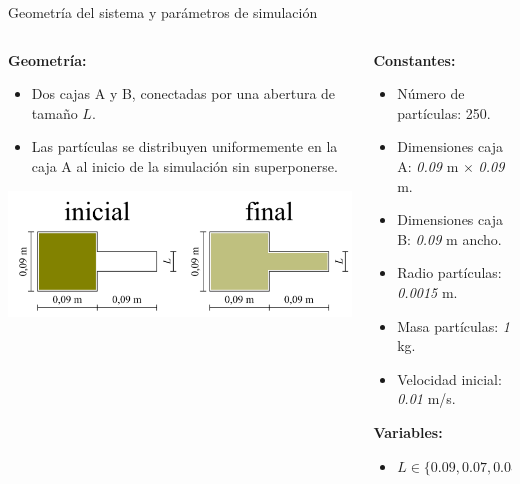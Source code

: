 \documentclass{beamer}
\begin{document}
\begin{frame}{Geometría del sistema y parámetros de simulación}
  \scriptsize
  \begin{columns}
    \begin{column}{0.5\textwidth}
      \textbf{Geometría:}
      \begin{itemize}
        \item Dos cajas A y B, conectadas por una abertura de tamaño $L$.
        \item Las partículas se distribuyen uniformemente en la caja A al inicio de la simulación sin superponerse.
      \end{itemize}
      \vspace{0.2cm}
      \begin{center}
        \includegraphics[width=0.85\linewidth]{photoMaterial/geometria.jpg}
      \end{center}
    \end{column}
    \begin{column}{0.5\textwidth}
      \textbf{Constantes:}
      \begin{itemize}
        \item Número de partículas: 250.
        \item Dimensiones caja A: \textit{0.09} m $\times$ \textit{0.09} m.
        \item Dimensiones caja B: \textit{0.09} m ancho.
        \item Radio partículas: \textit{0.0015} m.
        \item Masa partículas: \textit{1} kg.
        \item Velocidad inicial: \textit{0.01} m/s.
      \end{itemize}
      \vspace{0.2cm}
      \textbf{Variables:}
      \begin{itemize}
        \item $L \in \{ \textit{0.09}, \textit{0.07}, \textit{0.05}, \textit{0.03} \}$
      \end{itemize}
    \end{column}
  \end{columns}
\end{frame}
\end{document}
